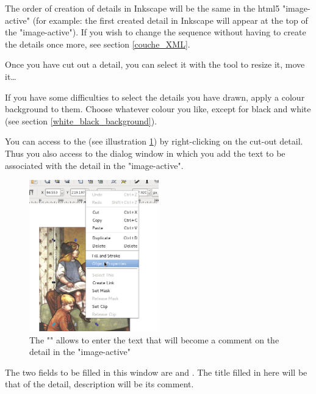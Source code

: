 
\begin{alerte}
 The order of creation of details in Inkscape will be 
 the same in the html5 "image-active" (for example: the first created detail in
Inkscape will appear at the top of the "image-active").
If you wish to change the sequence without having to create the details once more, see 
section \ref{couche_XML}.
\end{alerte}

Once you have cut out a detail, you can select it with the tool  
 to resize it, move it\ldots

\begin{astuce}
If you have some difficulties to select the details you have drawn,
apply a colour background to them. Choose whatever colour you like, except for black and white (see section \ref{white_black_background}).
\end{astuce}


You can access to the  (see illustration 
\ref{objet_properties}) by right-clicking on the cut-out detail. Thus you also access to the dialog window in which you add the text to be associated with the 
detail in the "image-active".

\begin{figure}[htp]
 \centering
 \includegraphics[width=0.5\textwidth, clip=true, trim=0mm 60mm 0mm 0mm]{./images/proprietes_objet}
 \caption{The "" allows to enter the text that will become a  comment on the detail in the "image-active"}
 \label{objet_properties}
\end{figure}

The two fields to be filled in this window are  and 
.  The title filled in here will be that of the detail, 
description will be its comment.

